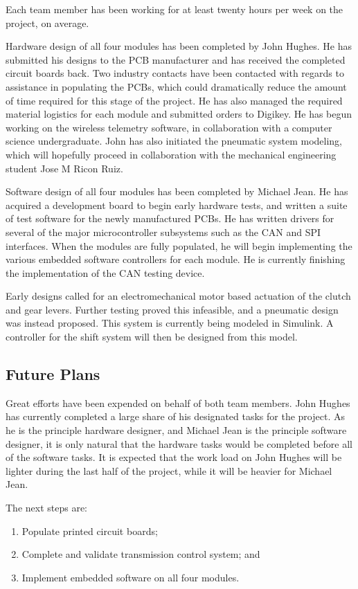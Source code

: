 \documentclass[12pt]{report}
\begin{document}
  Each team member has been working for at least twenty hours per week on the project, on average.

  Hardware design of all four modules has been completed by John Hughes. He has submitted his designs to the PCB manufacturer and has received the completed circuit boards back. Two industry contacts have been contacted with regards to assistance in populating the PCBs, which could dramatically reduce the amount of time required for this stage of the project. He has also managed the required material logistics for each module and submitted orders to Digikey. He has begun working on the wireless telemetry software, in collaboration with a computer science undergraduate. John has also initiated the pneumatic system modeling, which will hopefully proceed in collaboration with the mechanical engineering student Jose M Ricon Ruiz.

  Software design of all four modules has been completed by Michael Jean. He has acquired a development board to begin early hardware tests, and written a suite of test software for the newly manufactured PCBs. He has written drivers for several of the major microcontroller subsystems such as the CAN and SPI interfaces. When the modules are fully populated, he will begin implementing the various embedded software controllers for each module. He is currently finishing the implementation of the CAN testing device.

  Early designs called for an electromechanical motor based actuation of the clutch and gear levers. Further testing proved this infeasible, and a pneumatic design was instead proposed. This system is currently being modeled in Simulink. A controller for the shift system will then be designed from this model.

  \subsection{Future Plans}

  Great efforts have been expended on behalf of both team members. John Hughes has currently completed a large share of his designated tasks for the project. As he is the principle hardware designer, and Michael Jean is the principle software designer, it is only natural that the hardware tasks would be completed before all of the software tasks. It is expected that the work load on John Hughes will be lighter during the last half of the project, while it will be heavier for Michael Jean.

  The next steps are:
  \begin{enumerate}
  \item Populate printed circuit boards;
  \item Complete and validate transmission control system; and
  \item Implement embedded software on all four modules.
  \end{enumerate}
\end{document}
